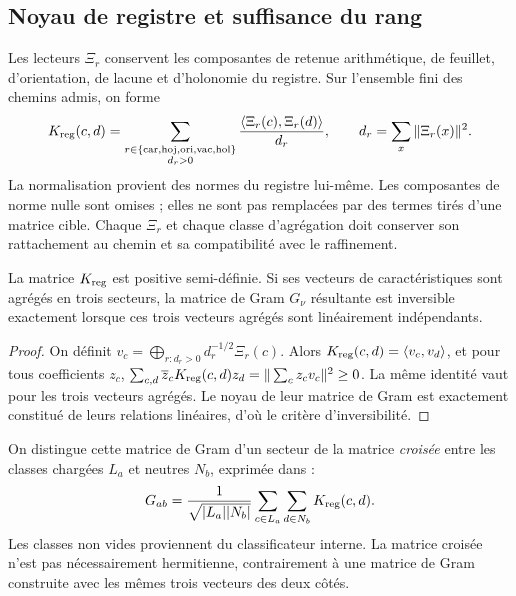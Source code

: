 \subsection{Noyau de registre et suffisance du rang}

Les lecteurs \(\Xi_r\) conservent les composantes de retenue arithmétique, de feuillet,
d'orientation, de lacune et d'holonomie du registre. Sur l'ensemble fini
des chemins admis, on forme
\begin{equation}
 K_{\rm reg}(c,d)=
 \sum_{\substack{r\in\{\mathrm{car},\mathrm{hoj},\mathrm{ori},
                           \mathrm{vac},\mathrm{hol}\}\\ d_r>0}}
 \frac{\langle\Xi_r(c),\Xi_r(d)\rangle}{d_r},
 \qquad
 d_r=\sum_x\|\Xi_r(x)\|^2.
 \label{eq:ii-reg-kernel}
\end{equation}
La normalisation provient des normes du registre lui-même. Les
composantes de norme nulle sont omises ; elles ne sont pas remplacées par des termes tirés
d'une matrice cible. Chaque \(\Xi_r\) et chaque classe d'agrégation doit
conserver son rattachement au chemin et sa compatibilité avec le raffinement.

\begin{proposition}
La matrice \(K_{\rm reg}\) est positive semi-définie. Si ses
vecteurs de caractéristiques sont agrégés en trois secteurs, la matrice de Gram
\(G_\nu\) résultante est inversible exactement lorsque ces trois vecteurs
agrégés sont linéairement indépendants.
\end{proposition}

\begin{proof}
On définit
\(v_c=\bigoplus_{r:d_r>0}d_r^{-1/2}\Xi_r(c)\).
Alors \(K_{\rm reg}(c,d)=\langle v_c,v_d\rangle\), et pour
tous coefficients \(z_c\),
\(\sum_{c,d}\overline z_cK_{\rm reg}(c,d)z_d
=\|\sum_c z_cv_c\|^2\ge0\).
La même identité vaut pour les trois vecteurs agrégés.
Le noyau de leur matrice de Gram est exactement constitué de leurs relations
linéaires, d'où le critère d'inversibilité.
\end{proof}

On distingue cette matrice de Gram d’un secteur de la matrice \emph{croisée} entre les
classes chargées \(L_a\) et neutres \(N_b\), exprimée dans \cite{mezcla} :
\begin{equation}
 G_{ab}=\frac1{\sqrt{|L_a||N_b|}}
       \sum_{c\in L_a}\sum_{d\in N_b}K_{\rm reg}(c,d).
 \label{eq:ii-cross-gram}
\end{equation}
Les classes non vides proviennent du classificateur interne. La matrice croisée
n'est pas nécessairement hermitienne, contrairement à une matrice de Gram construite avec
les mêmes trois vecteurs des deux côtés.

